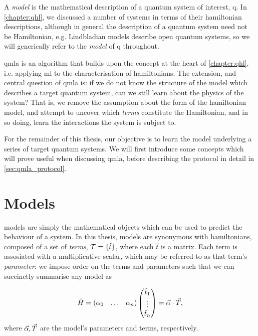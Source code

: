 

A \emph{model} is the mathematical description of a quantum system of interest, \gls{q}.
In \cref{chapter:qhl}, we discussed a number of systems in terms of their \gls{hamiltonian} descriptions,
    although in general the description of a quantum system need not be Hamiltonian, 
    e.g. Lindbladian models describe open quantum systems, 
    so we will generically refer to the \emph{\gls{model}} of \gls{q} throughout. 
\par 

\gls{qmla} is an algorithm that builds upon the concept at the heart of \cref{chapter:qhl},
    i.e. applying \gls{ml} to the characterisation of \glspl{hamiltonian}.
The extension, and central question of \gls{qmla} is:
    if we do not know the structure of the model which describes a target quantum system, 
    can we still learn about the physics of the system?
That is, we remove the assumption about the form of the \gls{hamiltonian} model, 
    and attempt to uncover which \emph{\glspl{term}} constitute the Hamiltonian, 
    and in so doing, learn the interactions the system is subject to. 
\par 

For the remainder of this thesis, our objective is to learn the model underlying 
    a series of target quantum systems.
We will first introduce some concepts which will prove useful when discussing \gls{qmla}, 
    before describing the protocol in detail in \cref{sec:qmla_protocol}.


\section{Models}\label{sec:models}
\Glspl{model} are simply the mathematical objects which can be used to predict the behaviour of a system. 
In this thesis, \glspl{model} are synonymous with \glspl{hamiltonian},
    composed of a set of \emph{\glspl{term}}, $\mathcal{T} = \{ \hat{t} \}$, 
    where each $\hat{t}$ is a matrix. 
Each term is assosiated with a multiplicative scalar, which may be referred to as that term's \emph{parameter}: 
    we impose order on the terms and parameters such that we can succinctly summarise any model as 

\begin{align}
    \label{eqn:model}
    \begin{split}
        \hat{H} = \begin{matrix}(\alpha_0 & \dots & \alpha_n)\end{matrix} \left(\begin{matrix}\hat{t}_1 \\ \vdots \\ \hat{t}_n\end{matrix}\right) = \vec{\alpha} \cdot { \vec{T} },
    \end{split}
\end{align}
    where $\vec{\alpha}, { \vec{T} }$ are the model's parameters and terms, respectively.

